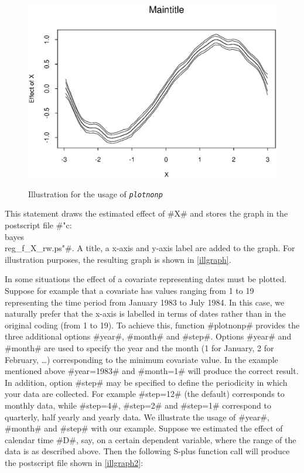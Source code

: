 \begin{figure}[ht]
\begin{center}
\includegraphics[scale=0.8]{grafiken/plotnonp.eps}
{\em\caption{ \label{illgraph} Illustration for the usage of
\em\tt plotnonp}}
\end{center}
\end{figure}

This statement draws the estimated effect of #X# and stores the
graph in the postscript file #"c:\\bayes\\reg_f_X_rw.ps"#. A
title, a x-axis and y-axis label are added to the graph. For
illustration purposes, the resulting graph is shown in
\autoref{illgraph}.

In some situations the effect of a covariate representing dates
must be plotted. Suppose for example that a covariate has values
ranging from 1 to 19 representing the time period from January
1983 to July 1984. In this case, we naturally prefer that the
x-axis is labelled in terms of dates rather than in the original
coding (from 1 to 19). To achieve this, function #plotnonp#
provides the three additional options #year#, #month# and #step#.
Options #year# and #month# are used to specify the year and the
month (1 for January, 2 for February, \dots) corresponding to the
minimum covariate value. In the example mentioned above
#year=1983# and #month=1# will produce the correct result. In
addition, option #step# may be specified to define the periodicity
in which your data are collected. For example #step=12# (the
default) corresponds to monthly data, while #step=4#, #step=2# and
#step=1# correspond to quarterly, half yearly and yearly data. We
illustrate the usage of #year#, #month# and #step# with our
example. Suppose we estimated the effect of calendar time #D#,
say, on a certain dependent variable, where the range of the data
is as described above. Then the following S-plus function call
will produce the postscript file shown in \autoref{illgraph2}:

